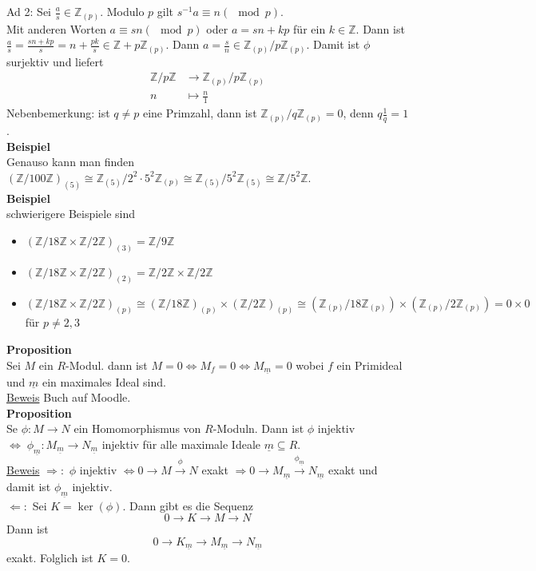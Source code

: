 \documentclass[a4paper, 12pt]{article}
\begin{document}
Ad 2: Sei $\frac{a}{s} \in \mathbb{Z}_{(p)}$. Modulo $p$ gilt $s^{-1}a \equiv n (\mod p)$.\\ Mit anderen Worten $a \equiv sn (\mod p)$ oder $a = sn + kp$ für ein $k \in \mathbb{Z}$. Dann ist $\frac{a}{s} = \frac{sn + kp}{s} = n + \frac{pk}{s} \in \mathbb{Z} + p\mathbb{Z}_{(p)}$. Dann $a = \frac{s}{n} \in \mathbb{Z}_{(p)}/p\mathbb{Z}_{(p)}$. Damit ist $\phi$ surjektiv und liefert \begin{align*}
	\mathbb{Z}/p\mathbb{Z} &\to \mathbb{Z}_{(p)}/p\mathbb{Z}_{(p)}\\
	n &\mapsto \frac{n}{1}
\end{align*}
Nebenbemerkung: ist $q \neq p$ eine Primzahl, dann ist $\mathbb{Z}_{(p)}/q\mathbb{Z}_{(p)} = 0$, denn $q\frac{1}{q} = 1$.\\
\textbf{Beispiel}\\
Genauso kann man finden $(\mathbb{Z}/100\mathbb{Z})_{(5)} \cong \mathbb{Z}_{(5)}/2^2\cdot 5^2\mathbb{Z}_{(p)} \cong \mathbb{Z}_{(5)}/5^2\mathbb{Z}_{(5)} \cong \mathbb{Z}/5^2\mathbb{Z}$.\\
\textbf{Beispiel}\\
schwierigere Beispiele sind \begin{itemize}
	\item $(\mathbb{Z}/18\mathbb{Z} \times \mathbb{Z}/2\mathbb{Z})_{(3)} = \mathbb{Z}/9\mathbb{Z}$
	\item$(\mathbb{Z}/18\mathbb{Z} \times \mathbb{Z}/2\mathbb{Z})_{(2)} = \mathbb{Z}/2\mathbb{Z} \times \mathbb{Z}/2\mathbb{Z}$
	\item $(\mathbb{Z}/18\mathbb{Z} \times \mathbb{Z}/2\mathbb{Z})_{(p)} \cong (\mathbb{Z}/18\mathbb{Z})_{(p)} \times (\mathbb{Z}/2\mathbb{Z})_{(p)} \cong (\mathbb{Z}_{(p)}/18\mathbb{Z}_{(p)}) \times (\mathbb{Z}_{(p)}/2\mathbb{Z}_{(p)}) = 0 \times 0$ für $p \neq 2,3$
\end{itemize}
\textbf{Proposition}\\
Sei $M$ ein $R$-Modul. dann ist $M = 0 \Leftrightarrow M_f = 0 \Leftrightarrow M_{\underline{m}} = 0$ wobei $f$ ein Primideal und $\underline{m}$ ein maximales Ideal sind.\\
\underline{Beweis} Buch auf Moodle.\\
\textbf{Proposition}\\
Se $\phi: M \to N$ ein Homomorphismus von $R$-Moduln. Dann ist $\phi$ injektiv $\Leftrightarrow \; \phi_{\underline{m}}: M_{\underline{m}} \to N_{\underline{m}}$ injektiv für alle maximale Ideale $\underline{m} \subseteq R$.\\
\underline{Beweis} $\Rightarrow:$ $\phi$ injektiv $\Leftrightarrow 0 \to M \overset{\phi}{\to} N$ exakt $\Rightarrow 0 \to M_{\underline{m}} \overset{\phi_{\underline{m}}}{\to} N_{\underline{m}}$ exakt und damit ist $\phi_{\underline{m}}$ injektiv.\\
$\Leftarrow:$ Sei $K = \ker(\phi)$. Dann gibt es die Sequenz \[0 \to K \to M \to N\]
Dann ist \[0 \to K_{\underline{m}} \to M_{\underline{m}} \to N_{\underline{m}}\] exakt. Folglich ist $K=0$.\\
\end{document}
